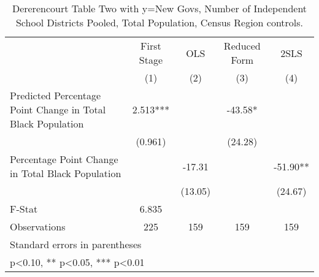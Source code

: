 \begin{table}[htbp]\centering
\def\sym#1{\ifmmode^{#1}\else\(^{#1}\)\fi}
\caption{Dererencourt Table Two with y=New Govs, Number of Independent School Districts  Pooled, Total Population, Census Region controls.}
\begin{tabular}{l*{4}{c}}
\toprule
                    & First Stage   &         OLS   &Reduced Form   &        2SLS   \\
                    &\multicolumn{1}{c}{(1)}   &\multicolumn{1}{c}{(2)}   &\multicolumn{1}{c}{(3)}   &\multicolumn{1}{c}{(4)}   \\
\midrule
Predicted Percentage Point Change in Total Black Population&       2.513***&               &      -43.58*  &               \\
                    &     (0.961)   &               &     (24.28)   &               \\
\addlinespace
Percentage Point Change in Total Black Population&               &      -17.31   &               &      -51.90** \\
                    &               &     (13.05)   &               &     (24.67)   \\
\midrule
F-Stat              &       6.835   &               &               &               \\
Observations        &         225   &         159   &         159   &         159   \\
\bottomrule
\multicolumn{5}{l}{\footnotesize Standard errors in parentheses}\\
\multicolumn{5}{l}{\footnotesize * p<0.10, ** p<0.05, *** p<0.01}\\
\end{tabular}
\end{table}
